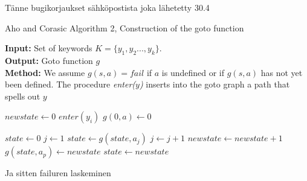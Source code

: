\documentclass[english,twoside,censored,csm,algorithms-track-2020]{HYthesisML}
\theoremstyle{plain}
\theoremstyle{definition}
\begin{document}
  Tänne bugikorjaukset sähköpostista joka lähetetty 30.4
  \begin{algorithm}
    
    \caption{Aho and Corasic Algorithm 2, Construction of the goto function} \label{ac-goto}
    \hspace*{\algorithmicindent} \textbf{Input:} Set of keywords $K = \{y_1,y_2...,y_k\}$.\\
    \hspace*{\algorithmicindent} \textbf{Output:} Goto function $g$\\
    \hspace*{\algorithmicindent} \textbf{Method:} We assume $g(s,a) = fail$ if $a$ is undefined or if $g(s,a)$ has not yet been defined. The procedure \textit{enter($y$)} inserts into the goto graph a path that spells out $y$
    
      \begin{algorithmic}[1]
          \State $newstate\gets 0$
            \State $enter(y_i)$
          \EndFor
            \State $g(0,a)\gets 0$
          \EndFor
        \EndFunction

          \State $state\gets 0$
          \State $j\gets 1$
            \State $state\gets g(state,a_j)$
            \State $j\gets j+1$
          \EndWhile
            \State $newstate\gets newstate+1$
            \State $g(state,a_p)\gets newstate$
            \State $state\gets newstate$
          \EndFor
        \EndFunction
      \end{algorithmic}
  \end{algorithm}

  Ja sitten failuren laskeminen
\end{document}
